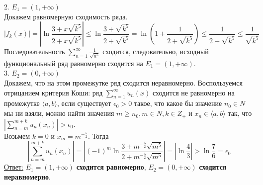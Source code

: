 \documentclass[a5paper, 10pt]{article}
\theoremstyle{definition}
\theoremstyle{plain}
\theoremstyle{remark}
\begin{document}
2.  $ E_1 = (1 , + \infty)$\\
Докажем равномерную сходимость ряда. 
\begin{equation*}
\left| f_k (x) \right| = \left| \ln \frac{3+x \sqrt{k^5}}{2+x\sqrt{k^5}} \right| \leq \ln \frac{3+\sqrt{k^5}}{2+\sqrt{k^5}}
= \ln \left( 1 +  \frac{1}{2+\sqrt{k^5}} \right) \leq \frac{1}{2+\sqrt{k^5}} \leq  \frac{1}{\sqrt{k^5}}
\end{equation*}
Последовательность $ \sum  \limits_{n = 1}^{\infty} \frac{1}{\sqrt{n^5}}$ сходится, следовательно, исходный функциональный ряд равномерно сходится на $ E_1 = (1 , + \infty)$.\\

3.  $ E_2 = (0 , +\infty)$\\
Докажем, что на этом промежутке ряд сходится неравномерно. Воспользуемся отрицанием критерия Коши: ряд $\sum  \limits_{n = 1}^{\infty} u_n (x)$ сходится не равномерно на промежутке $\langle a, b \rangle$, если существует $\epsilon_0 > 0$ такое, что какое бы значение $n_0 \in N$ мы ни взяли, можно найти значения $m \geq n_0, m \in N, k \in Z_+$ и $x_n \in \langle a, b \rangle$ так, что $\left|  \sum  \limits_{n = m}^{m+k} u_n (x_n) \right| > \epsilon_0$. \\
Возьмем $k = 0$ и $x_m = m^{-\frac{5}{2}}$. Тогда
\begin{equation*}
\left|  \sum  \limits_{n = m}^{m+k} u_n (x_n) \right|  = \left|(-1)^m \ln \frac{3+ m^{-\frac{5}{2}}\sqrt{m^5}}{2+ m^{-\frac{5}{2}}\sqrt{m^5}}\right|  =  \left|\ln \frac{4}{3}\right| > \ln \frac{7}{6} = \epsilon_0
\end{equation*}
\underline{Ответ:}   $ E_1 = (1 , + \infty)$ \textbf{сходится равномерно},  $ E_2 = (0 , +\infty)$ \textbf{ сходится неравномерно}.


\newpage
\end{document}
